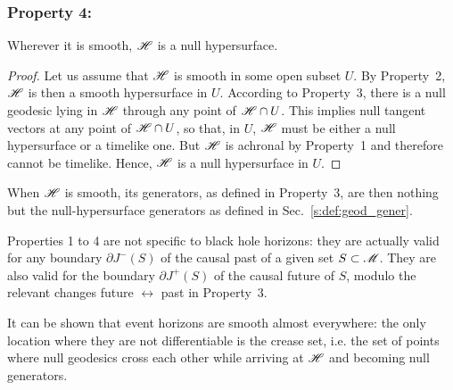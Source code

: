 \subsubsection{Property 4:}
\begin{greybox}
Wherever it is smooth, $\mathscr{H}$ is a null hypersurface.
\end{greybox}
\begin{proof}
Let us assume that $\mathscr{H}$ is smooth in some open subset $U$.
By Property~2, $\mathscr{H}$ is then a smooth hypersurface in $U$.
According to Property~3, there is a null geodesic lying in $\mathscr{H}$ through
any point of $\mathscr{H}\cap U$.
This implies null tangent vectors at any point of $\mathscr{H}\cap U$, so that, in $U$,
$\mathscr{H}$ must be either a null hypersurface or a timelike one. But $\mathscr{H}$ is achronal by Property~1 and therefore cannot be timelike. Hence, $\mathscr{H}$ is a null hypersurface in $U$.
\end{proof}
When $\mathscr{H}$ is smooth, its generators,
as defined in Property~3, are then nothing but the
null-hypersurface generators as defined in Sec.~\ref{s:def:geod_gener}.

\begin{remark}
Properties 1 to 4 are not specific to black hole horizons: they are actually
valid for any boundary $\partial J^-(S)$ of the causal past of a given set $S\subset\mathscr{M}$.
They are also valid for the boundary $\partial J^+(S)$ of the causal future of
$S$, modulo the relevant changes future $\leftrightarrow$ past in Property~3.
\end{remark}

It can be shown that event horizons are smooth almost everywhere: the only
location where they are not differentiable is the crease set, i.e. the set of points
where null geodesics cross each other while arriving at $\mathscr{H}$ and becoming null
generators.


